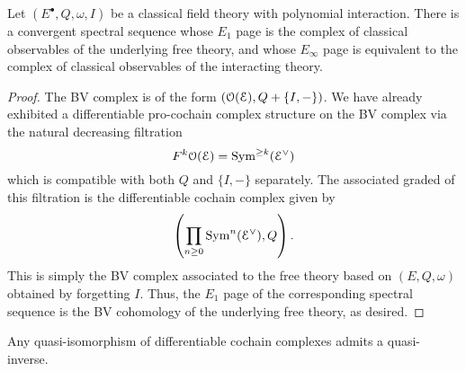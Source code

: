 \documentclass[10pt, oneside]{article}
\begin{document}
\begin{lemma} \label{free_int_ss_lemma}
Let $(E^\bullet, Q, \omega, I)$ be a classical field theory with polynomial interaction.  
There is a convergent spectral sequence whose $E_1$ page is the complex of classical observables of the underlying free theory, and whose $E_\infty$ page is equivalent to the complex of classical observables of the interacting theory.
\end{lemma}
\begin{proof}
The BV complex is of the form $\left(\mathcal O(\mathcal E), Q + \{I,-\}\right)$.
We have already exhibited  a differentiable pro-cochain complex structure on the BV complex via the 
natural decreasing filtration 
\[
F^k \mathcal O (\mathcal E) = {\rm Sym}^{\geq k} (\mathcal E^\vee)
\]
which is compatible with both $Q$ and $\{I,-\}$ separately.
The associated graded of this filtration is the differentiable cochain complex given by
\[
\left(\prod_{n \geq 0} {\rm Sym}^n (\mathcal E^\vee) , Q \right) .
\]
This is simply the BV complex associated to the free theory based on $(E, Q, \omega)$ obtained by forgetting $I$. 
Thus, the $E_1$ page of the corresponding spectral sequence is the BV cohomology of the underlying free theory, as desired. 
 
\end{proof}

\begin{lemma} \label{invert_quis_lemma}
Any quasi-isomorphism of differentiable cochain complexes admits a quasi-inverse.
\end{lemma}

\pagestyle{bib}
\printbibliography
\end{document}
